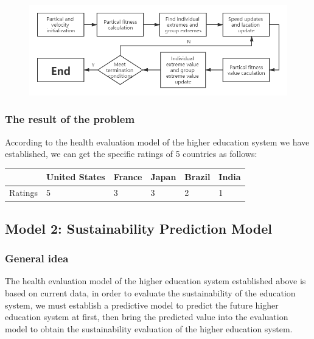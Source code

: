 \documentclass[12pt]{article}  %
\begin{document}
\begin{figure}[h!]
\centering
\includegraphics[scale=0.5]{biao3.png}
\caption{}
\label{fig:bp39}
\end{figure}


\subsubsection{The result of the problem}

According to the health evaluation model of the higher education system we have established, we can get the specific ratings of 5 countries as follows:

\begin{table}[hbt!]
\hspace{2.9cm}
\begin{tabular}{|l|l|l|l|l|l|}
\hline
        & United States & France & Japan & Brazil & India \\ \hline
Ratings & 5             & 3      & 3     & 2      & 1     \\ \hline
\end{tabular}
\end{table}






\subsection{Model 2: Sustainability Prediction Model }

\subsubsection{General idea}
The health evaluation model of the higher education system established above is based on current data, in order to evaluate the sustainability of the education system, we must establish a predictive model to predict the future higher education system at first, then bring the predicted value into the evaluation model to obtain the sustainability evaluation of the higher education system. 
\end{document}
